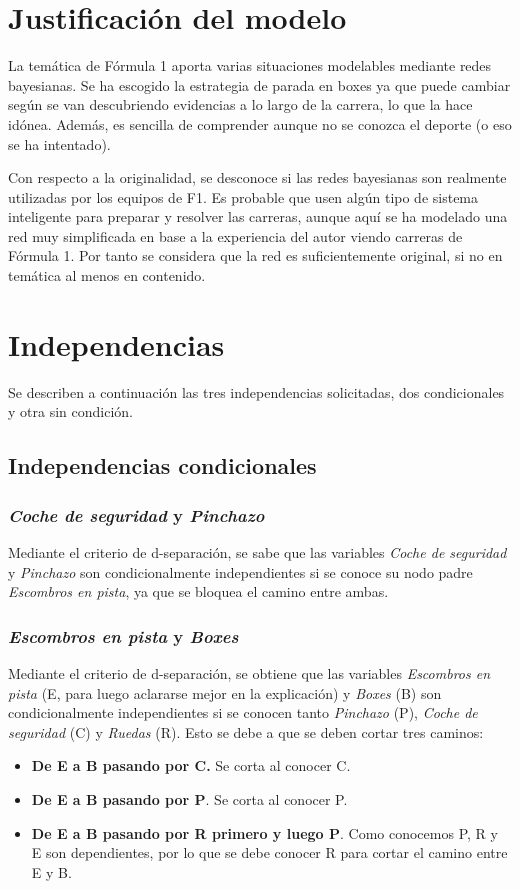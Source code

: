 \documentclass[]{article}
\begin{document}
\section{Justificación del modelo}
La temática de Fórmula 1 aporta varias situaciones modelables mediante redes bayesianas. Se ha escogido la estrategia de parada en boxes ya que puede cambiar según se van descubriendo evidencias a lo largo de la carrera, lo que la hace idónea. Además, es sencilla de comprender aunque no se conozca el deporte (o eso se ha intentado).

Con respecto a la originalidad, se desconoce si las redes bayesianas son realmente utilizadas por los equipos de F1. Es probable que usen algún tipo de sistema inteligente para preparar y resolver las carreras, aunque aquí se ha modelado una red muy simplificada en base a la experiencia del autor viendo carreras de Fórmula 1. Por tanto se considera que la red es suficientemente original, si no en temática al menos en contenido.
\section{Independencias}
Se describen a continuación las tres independencias solicitadas, dos condicionales y otra sin condición.
\subsection{Independencias condicionales}
\subsubsection{\textit{Coche de seguridad} y \textit{Pinchazo}}
Mediante el criterio de d-separación, se sabe que las variables \textit{Coche de seguridad} y \textit{Pinchazo} son condicionalmente independientes si se conoce su nodo padre \textit{Escombros en pista}, ya que se bloquea el camino entre ambas.
\subsubsection{\textit{Escombros en pista} y \textit{Boxes}}
Mediante el criterio de d-separación, se obtiene que las variables \textit{Escombros en pista} (E, para luego aclararse mejor en la explicación) y \textit{Boxes} (B) son condicionalmente independientes si se conocen tanto \textit{Pinchazo} (P), \textit{Coche de seguridad} (C) y \textit{Ruedas} (R). Esto se debe a que se deben cortar tres caminos:

\begin{itemize}
    \item \textbf{De E a B pasando por C.} Se corta al conocer C.
    \item \textbf{De E a B pasando por P}. Se corta al conocer P.
    \item \textbf{De E a B pasando por R primero y luego P}. Como conocemos P, R y E son dependientes, por lo que se debe conocer R para cortar el camino entre E y B.
\end{itemize}
\end{document}
